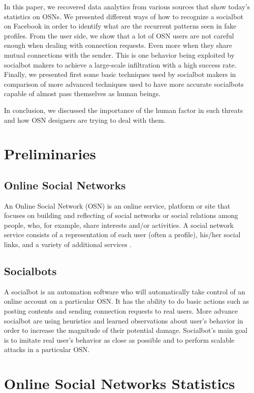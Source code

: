 \documentclass[12pt,a4paper]{article}
\begin{document}
In this paper, we recovered data analytics from various sources that show today’s
statistics on OSNs. We presented different ways of how to recognize a socialbot on Facebook
in order to identify what are the recurrent patterns seen in fake profiles. From the user
side, we show that a lot of OSN users are not careful enough when dealing with connection
requests. Even more when they share mutual connections with the sender. This is one behavior
being exploited by socialbot makers to achieve a large-scale infiltration with a high success
rate. Finally, we presented first some basic techniques used by socialbot makers in
comparison of more advanced techniques used to have more accurate socialbots capable of almost
pass themselves as human beings.

In conclusion, we discussed the importance of the human factor in such threats and how OSN
designers are trying to deal with them.

\section{Preliminaries}

  \subsection{Online Social Networks}
  An Online Social Network (OSN) is an online service, platform or site that focuses on building
  and reflecting of social networks or social relations among people, who, for example, share
  interests and/or activities. A social network service consists of a representation of each
  user (often a profile), his/her social links, and a variety of additional services
  \cite{wikipedia_social_networking_service}.

  \subsection{Socialbots}
  A socialbot is an automation software who will automatically take control of an online account
  on a particular OSN. It has the ability to do basic actions such as posting contents and
  sending connection requests to real users. More advance socialbot are using heuristics and
  learned observations about user’s behavior in order to increase the magnitude of their potential
  damage. Socialbot’s main goal is to imitate real user’s behavior as close as possible and to
  perform scalable attacks in a particular OSN.

\section{Online Social Networks Statistics}
\end{document}

